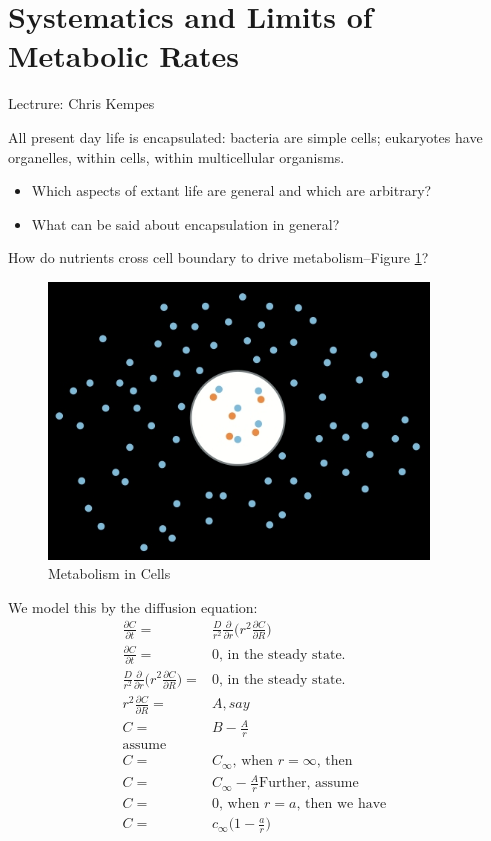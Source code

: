 \documentclass[]{article}
\begin{document}
\cite{simon2008organisation}

\section{Systematics and Limits of Metabolic Rates}

Lectrure: Chris Kempes


All present day life is encapsulated: bacteria are simple cells; eukaryotes have organelles, within cells, within multicellular organisms.
\begin{itemize}
	\item Which aspects of extant life are general and 	which are arbitrary?
	\item What can be said about encapsulation in general?
\end{itemize}

How do nutrients cross cell boundary to drive metabolism--Figure \ref{fig:Encapsulation1}?
\begin{figure}[H]
	\caption{Metabolism in Cells} \label{fig:Encapsulation1} 
	\includegraphics[width=0.9\textwidth]{Encapsulation1}
\end{figure}

We model this by the diffusion equation:
\begin{align*}
\frac{\partial C}{\partial t} =& \frac{D}{r^2} \frac{\partial}{\partial r}\big(r^2 \frac{\partial C}{\partial R} \big) \\
\frac{\partial C}{\partial t} =& 0 \text{, in the steady state.}\\
 \frac{D}{r^2} \frac{\partial}{\partial r}\big(r^2 \frac{\partial C}{\partial R} \big) =& 0 \text{, in the steady state.}\\
 r^2 \frac{\partial C}{\partial R} =& A {, say}\\
 C =& B - \frac{A}{r}\\
 \text{assume}& \\
 C =& C_{\infty}\text{, when $r=\infty$, then}\\
 C =& C_{\infty} - \frac{A}{r}
 \text{Further, assume}&\\
 C =& 0\text{, when $r=a$, then we have}\\
 C =& c_{\infty}\big(1 - \frac{a}{r}\big) 
\end{align*}
\end{document}
